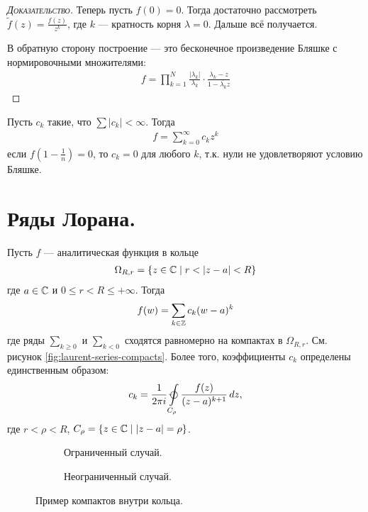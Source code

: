 \documentclass[../complex-analysis.tex]{subfiles}
\begin{document}
\begin{proof}[\normalfont\textsc{Доказательство}]
 Теперь пусть $ f(0) = 0 $. Тогда достаточно рассмотреть  $ \tilde f(z) = \frac{f(z)}{z^{k}} $, где $ k $ --- кратность корня $ \lambda = 0 $. Дальше всё получается.

 В обратную сторону построение --- это бесконечное произведение Бляшке с нормировочными множителями:
  \begin{align*}
   f = \prod_{k=1}^{N} \frac{\left| \lambda_k \right|}{\lambda_k} \cdot \frac{\lambda_k -z}{1 - \overline{\lambda_k} z}
 \end{align*}
\end{proof}

\begin{exmpl*}
 Пусть $ c_k $ такие, что $ \sum \left| c_k \right| < \infty $. Тогда
 \begin{align*}
  f = \sum_{k=0}^{\infty} c_k z^{k}
 \end{align*} если $ f\left(1 - \frac{1}{n}\right) = 0 $, то $ c_k = 0 $ для любого $ k $, т.к. нули не удовлетворяют условию Бляшке.
\end{exmpl*}

\newpage
\section{Ряды Лорана.}

\begin{thm}
 Пусть $ f $ --- аналитическая функция в кольце
 \begin{align*}
  \Omega_{R,r} = \left\{ z \in \mathbb{C} \mid r < \left| z - a \right| < R \right\}
 \end{align*} где $ a \in \mathbb{C} $ и $ 0 \leqslant r < R \leqslant +\infty $. Тогда
 \begin{align}
  \label{equation:loran_series}
  f(w) = \sum_{k \in \mathbb{Z}} c_k(w - a)^{k}
\end{align} где ряды $ \sum_{k \geqslant 0} $ и $ \sum_{k < 0} $ сходятся равномерно на компактах в $ \Omega_{R,r} $. См. рисунок \eqref{fig:laurent-series-compacts}. Более того, коэффициенты $ c_k $ определены единственным образом:
 \begin{align*}
  c_k = \frac{1}{2\pi i} \varointctrclockwise\limits_{C_\rho}   \frac{f(z)}{(z-a)^{k+1}}\,dz,
 \end{align*} где $ r < \rho < R $, $ C_\rho = \left\{ z \in \mathbb{C} \mid \left| z-a \right|=\rho \right\} $.
\end{thm}

\begin{figure}[h]

\begin{subfigure}{0.5\textwidth}
    \caption{Ограниченный случай.}
    \label{fig:laurent-series-compacts-limited}
\end{subfigure}
\begin{subfigure}{0.5\textwidth}
	\caption{Неограниченный случай.}
    \label{fig:laurent-series-compacts-not-limited}
\end{subfigure}

\caption{Пример компактов внутри кольца.}
\label{fig:laurent-series-compacts}
\end{figure}
\end{document}
